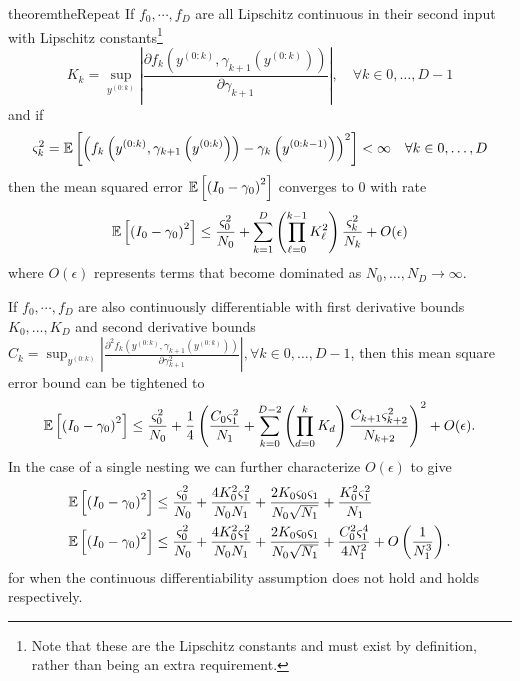 \begin{restatable}{theorem}{theRepeat}
	\label{the:Repeat} %
	If $f_0, \cdots, f_D$ are all Lipschitz continuous in their second input with Lipschitz 
	constants\footnote{Note that these are the Lipschitz constants and must exist by definition,
		rather than being an extra requirement.}
	\[K_k = \sup_{y^{(0:k)}} \left| \frac{\partial f_k\left(y^{(0:k)},\gamma_{k+1}(y^{(0:k)})\right)}{\partial \gamma_{k+1}}\right|, \quad \forall k
	\in 0,\dots,D-1
	\]
	and if 
	\[
	\varsigma_{k}^2  
	=\mathbb{E} \left[\left(f_k\left(y^{(0:k)},\gamma_{k+1}
	\left(y^{(0:k)}\right) \right)-\gamma_k\left(y^{(0:k-1)}\right)\right)^2\right] < \infty \quad \forall k\in 0,\dots,D
	\]
	then the mean squared error $\mathbb{E} \left[\left(I_0 - \gamma_0\right)^2\right] $ converges to $0$ with rate
	\begin{align}
	\label{eq:bound-lip}
	\mathbb{E} \left[\left(I_0 - \gamma_0\right)^2\right] \le
	\frac{\varsigma_{0}^2}{N_0} +
	\sum_{k=1}^{D} \left(\prod_{\ell=0}^{k-1} K_{\ell}^2\right)
	\frac{\varsigma_{k}^2}{N_{k}}+ O(\epsilon)
	\end{align}
	where $O(\epsilon)$ represents terms that become dominated as $N_0,\dots,N_D
	\rightarrow \infty$.
	
	If $f_0, \cdots, f_D$ are also continuously differentiable with first derivative bounds
	$K_0, \dots, K_D$ and second derivative bounds 
	$C_k = \sup_{y^{(0:k)}} \left|\frac{\partial^2 f_k\left(y^{(0:k)},\gamma_{k+1}(y^{(0:k)})\right)}{\partial \gamma^2_{k+1}}\right|, \forall k
	\in 0,\dots,D-1$, then this mean square error bound can be tightened to
	\begin{align}
	\label{eq:bound-cont}
	\mathbb{E} \left[\left(I_0 - \gamma_0\right)^2\right] \le 
	\frac{\varsigma_0^2}{N_0}
	+\frac{1}{4}\left(
	\frac{C_0 \varsigma_{1}^2}{N_{1}}
	+\sum_{k=0}^{D-2}  \left(\prod_{d=0}^{k} K_{d}\right)
	\frac{C_{k+1} \varsigma^2_{k+2}}{N_{k+2}}
	\right)^2 + O(\epsilon).
	\end{align}
	In the case of a single nesting we can further characterize $O(\epsilon)$ to give
	\begin{align}
	\mathbb{E} \left[\left(I_0 - \gamma_0\right)^2\right]  &\le \frac{\varsigma^2_0}{N_0}+\frac{4 K_{0}^2 \varsigma_1^2}{N_0 N_{1}}
	+\frac{2 K_{0}\varsigma_{0} \varsigma_1}{N_{0} \sqrt{N_1}}+\frac{K_0 ^2 \varsigma_1^2}{N_1} \\
	\mathbb{E} \left[\left(I_0 - \gamma_0\right)^2\right]  &\le \frac{\varsigma^2_0}{N_0}+\frac{4 K_{0}^2 \varsigma_1^2}{N_0 N_{1}}
	+\frac{2 K_{0}\varsigma_{0} \varsigma_1}{N_{0} \sqrt{N_1}}+\frac{C_0 ^2 \varsigma_1^4}{4 N_1^2}
	+ O\left(\frac{1}{N_1^{3}}\right).
	\end{align}
	for when the continuous differentiability assumption does not hold and 
	holds respectively.
\end{restatable}
